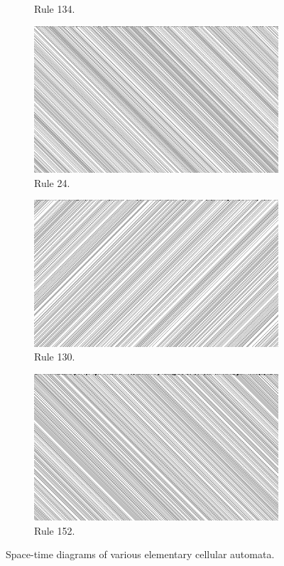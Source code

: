 \documentclass[12pt]{article}
\begin{document}
\begin{figure} [!h]
\begin{subfigure}{.5\textwidth}
  \caption{Rule 134.}
  \label{fig:rule134}
\end{subfigure}
\begin{subfigure}{.5\textwidth}
  \centering
  \includegraphics[width=.9\linewidth]{rule24}
  \caption{Rule 24.}
  \label{fig:rule24}
\end{subfigure}
\begin{subfigure}{.5\textwidth}
  \centering
  \includegraphics[width=.9\linewidth]{rule130}
  \caption{Rule 130.}
  \label{fig:rule130}
\end{subfigure}
\begin{subfigure}{.5\textwidth}
  \centering
  \includegraphics[width=.9\linewidth]{rule152}
  \caption{Rule 152.}
  \label{fig:rule152}
\end{subfigure}
\caption{Space-time diagrams of various elementary cellular automata.}
\label{fig:eca-diagonal-rules}
\end{figure}
\end{document}
